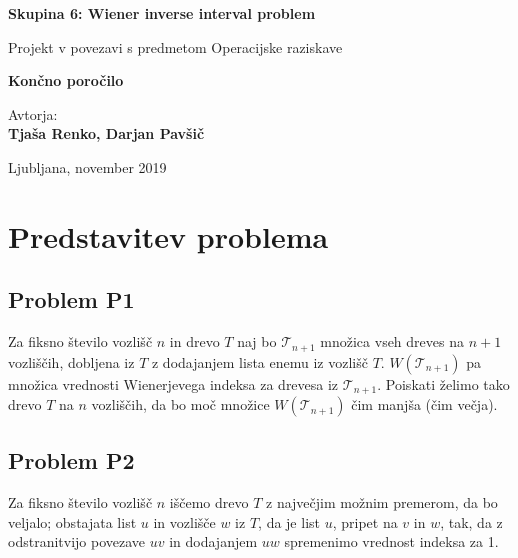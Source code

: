 \documentclass[a4paper, 12 pt]{article}
\begin{document}
\begin{titlepage}

\begin{center}



\Huge
\textbf{Skupina 6: Wiener inverse interval problem}

\vspace{0.5cm}
\large{Projekt v povezavi s predmetom Operacijske raziskave}

\vspace{2.5cm}
\Large
\textbf{Končno poročilo}

\vspace{2.5cm}
\large
Avtorja: \\
\textbf{Tjaša Renko, Darjan Pavšič}

\vfill

\large{Ljubljana, november 2019}


\end{center}
\end{titlepage}


\tableofcontents

\vspace{1cm}

\listoffigures

\pagebreak

\section{Predstavitev problema}

\subsection{Problem P1}

Za fiksno število vozlišč $n$ in drevo $T$ naj bo $\mathscr{T}_{n+1}$ množica vseh dreves na $n+1$ vozliščih, dobljena iz $T$ z dodajanjem lista enemu iz vozlišč $T$. $W(\mathscr{T}_{n+1})$ pa množica vrednosti Wienerjevega indeksa za drevesa iz $\mathscr{T}_{n+1}$. Poiskati želimo tako drevo $T$ na $n$ vozliščih, da bo moč množice $W(\mathscr{T}_{n+1})$ čim manjša (čim večja).


\subsection{Problem P2}

Za fiksno število vozlišč $n$ iščemo drevo $T$ z največjim možnim premerom, da bo veljalo; obstajata list $u$ in vozlišče $w$ iz $T$, da je list $u$, pripet na $v$ in $w$, tak, da z odstranitvijo povezave $uv$ in dodajanjem $uw$ spremenimo vrednost indeksa za 1.
\end{document}
